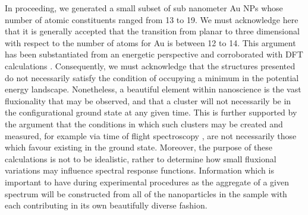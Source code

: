 In proceeding, we generated a small subset of sub nanometer Au NPs whose number of atomic constituents ranged from 13 to 19. We must acknowledge here that it is generally accepted that the transition from planar to three dimensional with respect to the number of atoms for Au is between 12 to 14. This argument has been substantiated from an energetic perspective and corroborated with DFT calculations \cite{doi:10.1063/1.1507582,doi:10.1021/jp035437i}. Consequently, we must acknowledge that the structures presented do not necessarily satisfy the condition of occupying a minimum in the potential energy landscape. Nonetheless, a beautiful element within nanoscience is the vast fluxionality that may be observed, and that a cluster will not necessarily be in the configurational ground state at any given time. This is further supported by the argument that the conditions in which such clusters may be created and measured, for example via time of flight spectroscopy \cite{PierroDoping}, are not necessarily those which favour existing in the ground state. Moreover, the purpose of these calculations is not to be idealistic, rather to determine how small fluxional variations may influence spectral response functions. Information which is important to have during experimental procedures as the aggregate of a given spectrum will be constructed from all of the nanoparticles in the sample with each contributing in its own beautifully diverse fashion.

